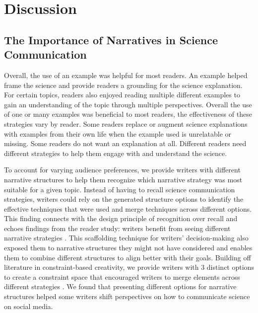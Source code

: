 \section{Discussion}






\subsection{The Importance of Narratives in Science Communication}
Overall, the use of an example was helpful for most readers. An example helped frame the science and provide readers a grounding for the science explanation. For certain topics, readers also enjoyed reading multiple different examples to gain an understanding of the topic through multiple perspectives. Overall the use of one or many examples was beneficial to most readers, the effectiveness of these strategies vary by reader. Some readers replace or augment science explanations with examples from their own life when the example used is unrelatable or missing. Some readers do not want an explanation at all. Different readers need different strategies to help them engage with and understand the science. 

To account for varying audience preferences, we provide writers with different narrative structures to help them recognize which narrative strategy was most suitable for a given topic. Instead of having to recall science communication strategies, writers could rely on the generated structure options to identify the effective techniques that were used and merge techniques across different options. This finding connects with the design principle of recognition over recall and echoes findings from the reader study: writers benefit from seeing different narrative strategies \cite{du1994recognition}. This scaffolding technique for writers’ decision-making also exposed them to narrative structures they might not have considered and enables them to combine different structures to align better with their goals. Building off literature in constraint-based creativity, we provide writers with 3 distinct options to create a constraint space that encouraged writers to merge elements across different strategies \cite{TROMP2022101184, collins2024building}. We found that presenting different options for narrative structures helped some writers shift perspectives on how to communicate science on social media.

